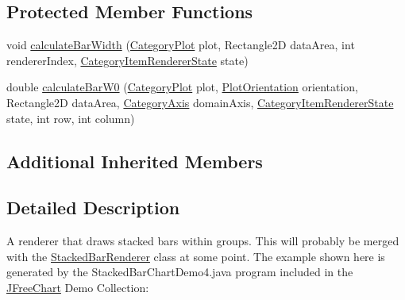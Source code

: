 \subsection*{Protected Member Functions}
\begin{DoxyCompactItemize}
\item 
void \mbox{\hyperlink{classorg_1_1jfree_1_1chart_1_1renderer_1_1category_1_1_grouped_stacked_bar_renderer_a1566491051a0eb54b5122db54f69a156}{calculate\+Bar\+Width}} (\mbox{\hyperlink{classorg_1_1jfree_1_1chart_1_1plot_1_1_category_plot}{Category\+Plot}} plot, Rectangle2D data\+Area, int renderer\+Index, \mbox{\hyperlink{classorg_1_1jfree_1_1chart_1_1renderer_1_1category_1_1_category_item_renderer_state}{Category\+Item\+Renderer\+State}} state)
\item 
double \mbox{\hyperlink{classorg_1_1jfree_1_1chart_1_1renderer_1_1category_1_1_grouped_stacked_bar_renderer_aa5c26c984650157403fe29633654f371}{calculate\+Bar\+W0}} (\mbox{\hyperlink{classorg_1_1jfree_1_1chart_1_1plot_1_1_category_plot}{Category\+Plot}} plot, \mbox{\hyperlink{classorg_1_1jfree_1_1chart_1_1plot_1_1_plot_orientation}{Plot\+Orientation}} orientation, Rectangle2D data\+Area, \mbox{\hyperlink{classorg_1_1jfree_1_1chart_1_1axis_1_1_category_axis}{Category\+Axis}} domain\+Axis, \mbox{\hyperlink{classorg_1_1jfree_1_1chart_1_1renderer_1_1category_1_1_category_item_renderer_state}{Category\+Item\+Renderer\+State}} state, int row, int column)
\end{DoxyCompactItemize}
\subsection*{Additional Inherited Members}


\subsection{Detailed Description}
A renderer that draws stacked bars within groups. This will probably be merged with the \mbox{\hyperlink{classorg_1_1jfree_1_1chart_1_1renderer_1_1category_1_1_stacked_bar_renderer}{Stacked\+Bar\+Renderer}} class at some point. The example shown here is generated by the {\ttfamily Stacked\+Bar\+Chart\+Demo4.\+java} program included in the \mbox{\hyperlink{classorg_1_1jfree_1_1chart_1_1_j_free_chart}{J\+Free\+Chart}} Demo Collection\+: ~\newline
~\newline
  

